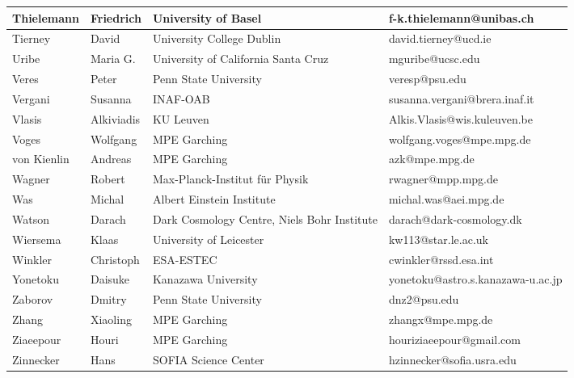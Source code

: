 \begin{center}
\begin{longtable}{|p{1.6cm} |p{1.6cm} |p{2cm} |p{3cm} |}
\tiny Thielemann &\tiny Friedrich & \tiny University of Basel & \tiny f-k.thielemann@unibas.ch \\ \hline
\tiny Tierney &\tiny David & \tiny University College Dublin & \tiny david.tierney@ucd.ie \\ \hline
\tiny Uribe &\tiny Maria G. & \tiny University of California Santa Cruz & \tiny mguribe@ucsc.edu \\ \hline
\tiny Veres &\tiny Peter & \tiny Penn State University & \tiny veresp@psu.edu \\ \hline
\tiny Vergani &\tiny Susanna & \tiny INAF-OAB & \tiny susanna.vergani@brera.inaf.it \\ \hline
\tiny Vlasis &\tiny Alkiviadis & \tiny KU Leuven & \tiny Alkis.Vlasis@wis.kuleuven.be \\ \hline
\tiny Voges &\tiny Wolfgang & \tiny MPE Garching & \tiny wolfgang.voges@mpe.mpg.de \\ \hline
\tiny von Kienlin &\tiny Andreas & \tiny MPE Garching & \tiny azk@mpe.mpg.de \\ \hline
\tiny Wagner &\tiny Robert & \tiny Max-Planck-Institut f\"ur Physik & \tiny rwagner@mpp.mpg.de \\ \hline
\tiny Was &\tiny Michal & \tiny Albert Einstein Institute & \tiny michal.was@aei.mpg.de \\ \hline
\tiny Watson &\tiny Darach & \tiny Dark Cosmology Centre, Niels Bohr Institute & \tiny darach@dark-cosmology.dk \\ \hline
\tiny Wiersema &\tiny Klaas & \tiny University of Leicester & \tiny kw113@star.le.ac.uk \\ \hline
\tiny Winkler &\tiny Christoph & \tiny ESA-ESTEC & \tiny cwinkler@rssd.esa.int \\ \hline
\tiny Yonetoku &\tiny Daisuke & \tiny Kanazawa University & \tiny yonetoku@astro.s.kanazawa-u.ac.jp \\ \hline
\tiny Zaborov &\tiny Dmitry & \tiny Penn State University & \tiny dnz2@psu.edu \\ \hline
\tiny Zhang &\tiny Xiaoling & \tiny MPE Garching & \tiny zhangx@mpe.mpg.de \\ \hline
\tiny Ziaeepour &\tiny Houri & \tiny MPE Garching & \tiny houriziaeepour@gmail.com \\ \hline
\tiny Zinnecker &\tiny Hans & \tiny SOFIA Science Center & \tiny hzinnecker@sofia.usra.edu \\ \hline
    \hline
  \end{longtable}
\end{center}
